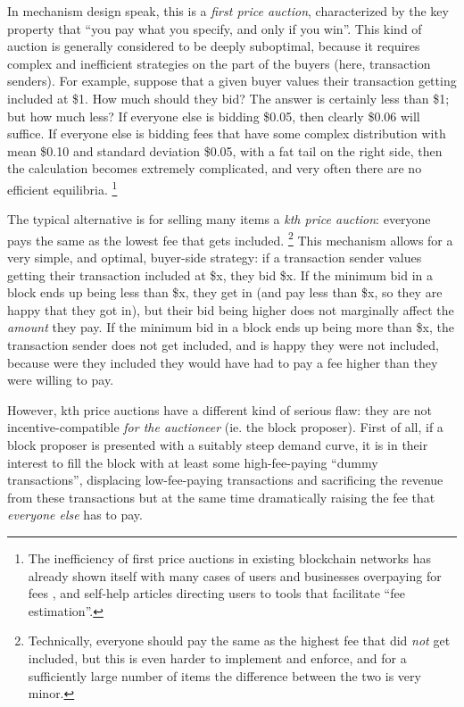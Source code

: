 \documentclass[12pt, final]{article}
\begin{document}
In mechanism design speak, this is a \emph{first price auction}, characterized by the key property that ``you pay what you specify, and only if you win''. This kind of auction is generally considered to be deeply suboptimal, because it requires complex and inefficient strategies on the part of the buyers (here, transaction senders). For example, suppose that a given buyer values their transaction getting included at \$1. How much should they bid? The answer is certainly less than \$1; but how much less? If everyone else is bidding \$0.05, then clearly \$0.06 will suffice. If everyone else is bidding fees that have some complex distribution with mean \$0.10 and standard deviation \$0.05, with a fat tail on the right side, then the calculation becomes extremely complicated, and very often there are no efficient equilibria. \cite{poa-in-auctions} \footnote{The inefficiency of first price auctions in existing blockchain networks has already shown itself with many cases of users and businesses overpaying for fees \cite{bithumb-fees}, and self-help articles directing users to tools that facilitate ``fee estimation''\cite{fee-estimation}.}

The typical alternative is for selling many items a \emph{kth price auction}: everyone pays the same as the lowest fee that gets included. \footnote{Technically, everyone should pay the same as the highest fee that did \emph{not} get included, but this is even harder to implement and enforce, and for a sufficiently large number of items the difference between the two is very minor.} This mechanism allows for a very simple, and optimal, buyer-side strategy: if a transaction sender values getting their transaction included at \$x, they bid \$x. If the minimum bid in a block ends up being less than \$x, they get in (and pay less than \$x, so they are happy that they got in), but their bid being higher does not marginally affect the \emph{amount} they pay. If the minimum bid in a block ends up being more than \$x, the transaction sender does not get included, and is happy they were not included, because were they included they would have had to pay a fee higher than they were willing to pay.

However, kth price auctions have a different kind of serious flaw: they are not incentive-compatible \emph{for the auctioneer} (ie. the block proposer). First of all, if a block proposer is presented with a suitably steep demand curve, it is in their interest to fill the block with at least some high-fee-paying ``dummy transactions'', displacing low-fee-paying transactions and sacrificing the revenue from these transactions but at the same time dramatically raising the fee that \emph{everyone else} has to pay.
\end{document}
